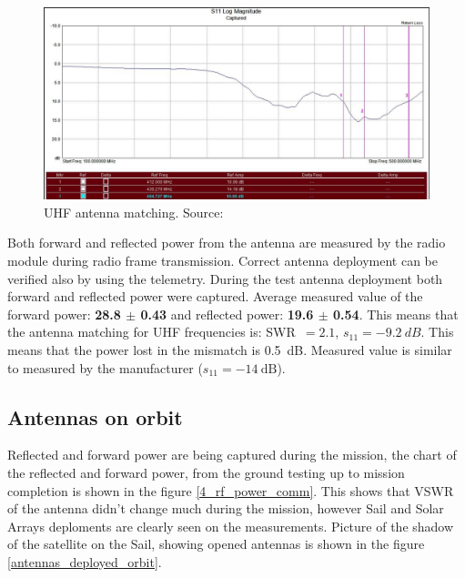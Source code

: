 \begin{figure}
    \centering
    \includegraphics[width=0.8\paperwidth]{img/6/isis_s11_uhf.png}
    \caption{UHF antenna matching. Source: \cite{isis_ant_test_report}}
    \label{isis_s11_uhf}
\end{figure}


Both forward and reflected power from the antenna are measured by the radio module during radio frame transmission. Correct antenna deployment can be verified also by using the telemetry. During the test antenna deployment both forward and reflected power were captured. Average measured value of the forward power: \textbf{\SI{28.8}{\dBm} $\pm$ \SI{0.43}{\dBm}} and reflected power: \textbf{\SI{19.6}{\dBm} $\pm$ \SI{0.54}{\dBm}}. This means that the antenna matching for UHF frequencies is: SWR~$= 2.1$, $s_{11} = -9.2~dB$. This means that the power lost in the mismatch is \SI{0.5}{\dB}. Measured value is similar to measured by the manufacturer ($s_{11} = \SI{-14}{\dB}$).

\subsection{Antennas on orbit}
Reflected and forward power are being captured during the mission, the chart of the reflected and forward power, from the ground testing up to mission completion is shown in the figure \ref{4_rf_power_comm}. This shows that VSWR of the antenna didn't change much during the mission, however Sail and Solar Arrays deploments are clearly seen on the measurements. Picture of the shadow of the satellite on the Sail, showing opened antennas is shown in the figure \ref{antennas_deployed_orbit}.


